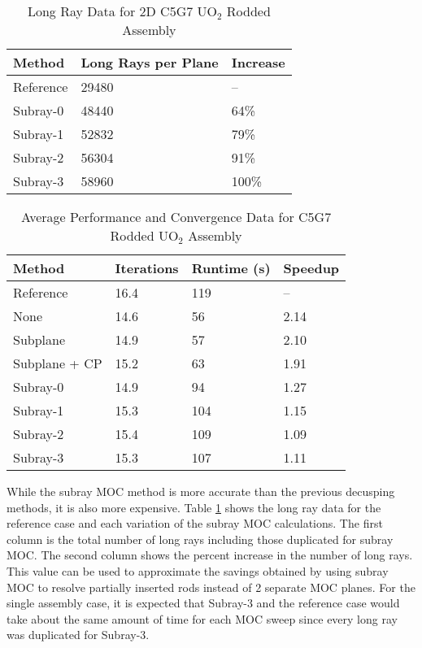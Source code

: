\begin{table}[h]
    \centering
    \caption{Long Ray Data for 2D C5G7 UO\texorpdfstring{$_2$}{2} Rodded Assembly}\label{t:subray-data-2dassembly}
    \begin{tabular}{l l l}\toprule
        Method & Long Rays per Plane & Increase \\\midrule
        Reference & 29480 & -- \\
        Subray-0 & 48440 & 64\% \\
        Subray-1 & 52832 & 79\% \\
        Subray-2 & 56304 & 91\% \\
        Subray-3 & 58960 & 100\% \\
        \bottomrule
    \end{tabular}
\end{table}

\begin{table}[h]
    \centering
    \caption{Average Performance and Convergence Data for C5G7 Rodded UO\texorpdfstring{$_2$}{2} Assembly}\label{t:subray-performance-2dassembly}
    \begin{tabular}{l l l l}\toprule
        Method & Iterations & Runtime (s) & Speedup \\\midrule
Reference     & 16.4 & 119 & --   \\
None          & 14.6 & 56 & 2.14 \\
Subplane      & 14.9 & 57 & 2.10 \\
Subplane + CP & 15.2 & 63 & 1.91 \\
Subray-0      & 14.9 & 94 & 1.27  \\
Subray-1      & 15.3 & 104 & 1.15 \\ 
Subray-2      & 15.4 & 109 & 1.09 \\ 
Subray-3      & 15.3 & 107 & 1.11 \\ 
        \bottomrule
    \end{tabular}
\end{table}

While the subray MOC method is more accurate than the previous decusping methods, it is also more expensive.  Table \ref{t:subray-data-2dassembly} shows the long ray data for the reference case and each variation of the subray MOC calculations.  The first column is the total number of long rays including those duplicated for subray MOC.  The second column shows the percent increase in the number of long rays.  This value can be used to approximate the savings obtained by using subray MOC to resolve partially inserted rods instead of 2 separate MOC planes.  For the single assembly case, it is expected that Subray-3 and the reference case would take about the same amount of time for each MOC sweep since every long ray was duplicated for Subray-3.

